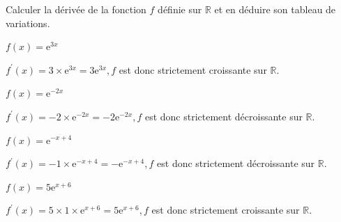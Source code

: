\documentclass[11pt,a4paper]{article}  %
\begin{document}
Calculer la dérivée de la fonction $f$ définie sur $\mathbb{R}$ et en déduire son tableau de variations.
\begin{enumMet}
	\item $f(x)=\mathrm{e}^{3 x}$
	\begin{corrBox}
		$f^{\prime}(x)=3 \times \mathrm{e}^{3 x}=3 \mathrm{e}^{3 x}, f$ est donc strictement croissante sur $\mathbb{R}$.		
	\end{corrBox}
	\item $f(x)=\mathrm{e}^{-2 x}$
	\begin{corrBox}
		$f^{\prime}(x)=-2 \times \mathrm{e}^{-2 x}=-2 \mathrm{e}^{-2 x}, f$ est donc strictement décroissante sur $\mathbb{R}$.		
	\end{corrBox}
	\item $f(x)=\mathrm{e}^{-x+4}$
	\begin{corrBox}
		$f^{\prime}(x)=-1 \times \mathrm{e}^{-x+4}=-\mathrm{e}^{-x+4}, f$ est donc strictement décroissante sur $\mathbb{R}$.		
	\end{corrBox}
	\item $f(x)=5 \mathrm{e}^{x+6}$
	\begin{corrBox}
		$f^{\prime}(x)=5 \times 1 \times \mathrm{e}^{x+6}=5 \mathrm{e}^{x+6}, f$ est donc strictement croissante sur $\mathbb{R}$.		
	\end{corrBox}
\end{enumMet}

\end{document}
